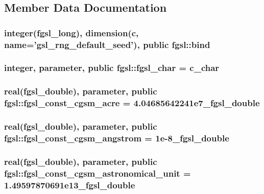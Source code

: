 \subsection{Member Data Documentation}
\hypertarget{classfgsl_a64406a5e119fa92e47b1adcddb152e91}{
\subsubsection[{bind}]{\setlength{\rightskip}{0pt plus 5cm}integer({\bf fgsl\-\_\-long}), dimension(c, name='gsl\-\_\-rng\-\_\-default\-\_\-seed'), public fgsl\-::bind}}\label{classfgsl_a64406a5e119fa92e47b1adcddb152e91}
\hypertarget{classfgsl_a12911ae4a4462f8e892d903081e77ab4}{
\subsubsection[{fgsl\-\_\-char}]{\setlength{\rightskip}{0pt plus 5cm}integer, parameter, public fgsl\-::fgsl\-\_\-char = c\-\_\-char}}\label{classfgsl_a12911ae4a4462f8e892d903081e77ab4}
\hypertarget{classfgsl_a6417ace541dc0310036197a333495c36}{
\subsubsection[{fgsl\-\_\-const\-\_\-cgsm\-\_\-acre}]{\setlength{\rightskip}{0pt plus 5cm}real({\bf fgsl\-\_\-double}), parameter, public fgsl\-::fgsl\-\_\-const\-\_\-cgsm\-\_\-acre = 4.\-04685642241e7\-\_\-fgsl\-\_\-double}}\label{classfgsl_a6417ace541dc0310036197a333495c36}
\hypertarget{classfgsl_aedfe01763a71e3f82c2dee8a2586b442}{
\subsubsection[{fgsl\-\_\-const\-\_\-cgsm\-\_\-angstrom}]{\setlength{\rightskip}{0pt plus 5cm}real({\bf fgsl\-\_\-double}), parameter, public fgsl\-::fgsl\-\_\-const\-\_\-cgsm\-\_\-angstrom = 1e-\/8\-\_\-fgsl\-\_\-double}}\label{classfgsl_aedfe01763a71e3f82c2dee8a2586b442}
\hypertarget{classfgsl_af1dd23df42a3363f75423e5d3ff79cde}{
\subsubsection[{fgsl\-\_\-const\-\_\-cgsm\-\_\-astronomical\-\_\-unit}]{\setlength{\rightskip}{0pt plus 5cm}real({\bf fgsl\-\_\-double}), parameter, public fgsl\-::fgsl\-\_\-const\-\_\-cgsm\-\_\-astronomical\-\_\-unit = 1.\-49597870691e13\-\_\-fgsl\-\_\-double}}\label{classfgsl_af1dd23df42a3363f75423e5d3ff79cde}
